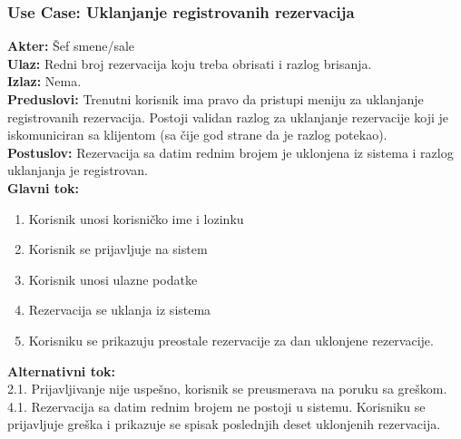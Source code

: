 \documentclass{article}
\begin{document}
\subsubsection{\textbf{Use Case}: Uklanjanje registrovanih rezervacija}
\textbf{Akter:} Šef smene/sale\\
\textbf{Ulaz:} Redni broj rezervacija koju treba obrisati i razlog brisanja.\\
\textbf{Izlaz:} Nema.\\
\textbf{Preduslovi:} Trenutni korisnik ima pravo da pristupi meniju za uklanjanje registrovanih rezervacija. Postoji validan razlog za uklanjanje rezervacije koji je iskomuniciran sa klijentom (sa čije god strane da je razlog potekao).\\
\textbf{Postuslov:} Rezervacija sa datim rednim brojem je uklonjena iz sistema i razlog uklanjanja je registrovan.\\
\textbf{Glavni tok:}
\begin{enumerate}
\item Korisnik unosi korisničko ime i lozinku
\item Korisnik se prijavljuje na sistem
\item Korisnik unosi ulazne podatke
\item Rezervacija se uklanja iz sistema
\item Korisniku se prikazuju preostale rezervacije za dan uklonjene rezervacije.\\
\end{enumerate}
\textbf{Alternativni tok:}\\
       2.1. Prijavljivanje nije uspešno, korisnik se preusmerava na poruku sa greškom.\\
	   4.1. Rezervacija sa datim rednim brojem ne postoji u sistemu. Korisniku se prijavljuje greška i prikazuje se spisak poslednjih deset uklonjenih rezervacija.\\
\end{document}
